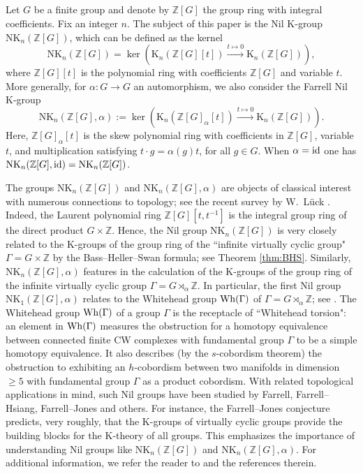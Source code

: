 \documentclass[reqno,11pt,letterpaper]{amsart}
\theoremstyle{plain}
\numberwithin{equation}{subsection}
\theoremstyle{remark}
\theoremstyle{plain}
\theoremstyle{definition}\newtheorem*{notation}{Notation}
\newcommand{\RK}{\mathrm{K}}
\newcommand{\RNK}{\mathrm{NK}}
\newcommand{\BZ}{\mathbb{Z}}
\begin{document}
 
 \subsection{}   Let $G$ be a finite group and  denote by $\BZ[G]$ the group ring with integral coefficients. Fix an integer $n$. The subject of this paper is the Nil $\RK$-group $\RNK_n(\BZ[G])$, which can be defined as the kernel
 \[
 \RNK_n(\BZ[G])=\ker(\RK_n(\BZ[G][t])\xrightarrow{t\mapsto 0} \RK_n(\BZ[G])),
 \]
where $ \BZ[G][t]$ is the polynomial ring with coefficients $\BZ[G]$ and variable $t$. 
 More generally, for $\alpha: G\to G$ an automorphism, we also consider the Farrell Nil $\RK$-group  
  \[
\RNK_n(\BZ[G], \alpha):=   \ker(\RK_n(\BZ[G]_\alpha[t])\xrightarrow{t\mapsto 0} \RK_n(\BZ[G])).
  \]
 Here, $\BZ[G]_\alpha[t]$ is the skew polynomial ring with coefficients in $\BZ[G]$, variable $t$, and multiplication satisfying $t\cdot g = \alpha(g)t$, for all $g\in G$. When $\alpha={\rm id}$ one has $\RNK_n(\BZ[G], {\rm id})=\RNK_n(\BZ[G])$.

 The groups $ \RNK_n(\BZ[G])$ and $\RNK_n(\BZ[G], \alpha)$ are objects of classical interest with numerous connections to topology; see the recent survey by W.~L\"uck \cite{Luck}.
Indeed,   the Laurent polynomial ring $\BZ[G][t, t^{-1}]$ is the integral group ring of the direct product $ G\times \BZ$. Hence, the Nil group $\RNK_n(\BZ[G])$ is very closely related to the $\RK$-groups of the group ring of the ``infinite virtually  cyclic group" $\Gamma=G\times \BZ$ by the Bass--Heller--Swan formula; see Theorem \ref{thm:BHS}.
Similarly, $\RNK_n(\BZ[G], \alpha)$ features in the calculation of the $\RK$-groups of the group ring of the infinite virtually  cyclic group $\Gamma=G\rtimes_\alpha \BZ$.
In particular,  the first Nil group $ \RNK_1(\BZ[G],\alpha)$ relates to the Whitehead group ${\rm Wh}(\Gamma)$ of  $\Gamma=G\rtimes_\alpha \BZ$; see \cite{FaHs}.
The Whitehead group ${\rm Wh}(\Gamma)$ of a group $\Gamma$ is the receptacle of 
 ``Whitehead torsion": an element in  ${\rm Wh}(\Gamma)$ measures the obstruction for a homotopy equivalence between connected finite CW complexes with 
fundamental group $\Gamma$ to be a simple homotopy equivalence.
It also describes (by the $s$-cobordism theorem) the obstruction to exhibiting an $h$-cobordism between two manifolds in dimension $\geq 5$ with fundamental group $\Gamma$ as a product cobordism. With related topological applications in mind, 
such Nil groups have been studied by Farrell, Farrell--Hsiang,  Farrell--Jones and others.  For instance, the Farrell--Jones conjecture predicts, very roughly, that the $\RK$-groups of virtually cyclic groups provide the building blocks for the $\RK$-theory of all groups. This emphasizes the importance of understanding 
Nil groups like $ \RNK_n(\BZ[G])$ and $\RNK_n(\BZ[G], \alpha)$. For additional information, we refer the reader to \cite{Luck} and the references therein.
 
\end{document}

